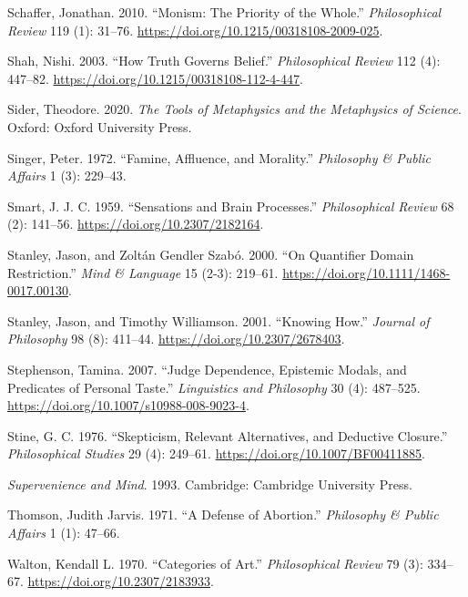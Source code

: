 \documentclass[
  12pt,
  letterpaper,
  DIV=11,
  numbers=noendperiod]{scrartcl}
\newlength{\cslhangindent}
\newenvironment{CSLReferences}[2] %
 {\begin{list}{}{%
  \setlength{\itemindent}{0pt}
  \setlength{\leftmargin}{0pt}
  \setlength{\parsep}{0pt}
  \ifodd #1
   \setlength{\leftmargin}{\cslhangindent}
   \setlength{\itemindent}{-1\cslhangindent}
  \fi
  \setlength{\itemsep}{#2\baselineskip}}}
 {\end{list}}
\begin{document}
\begin{CSLReferences}{1}{0}
Schaffer, Jonathan. 2010. {``Monism: The Priority of the Whole.''}
\emph{Philosophical Review} 119 (1): 31--76.
\url{https://doi.org/10.1215/00318108-2009-025}.

Shah, Nishi. 2003. {``How Truth Governs Belief.''} \emph{Philosophical
Review} 112 (4): 447--82.
\url{https://doi.org/10.1215/00318108-112-4-447}.

Sider, Theodore. 2020. \emph{The Tools of Metaphysics and the
Metaphysics of Science}. Oxford: Oxford University Press.

Singer, Peter. 1972. {``Famine, Affluence, and Morality.''}
\emph{Philosophy \& Public Affairs} 1 (3): 229--43.

Smart, J. J. C. 1959. {``Sensations and Brain Processes.''}
\emph{Philosophical Review} 68 (2): 141--56.
\url{https://doi.org/10.2307/2182164}.

Stanley, Jason, and Zoltán Gendler Szabó. 2000. {``On Quantifier Domain
Restriction.''} \emph{Mind \& Language} 15 (2-3): 219--61.
\url{https://doi.org/10.1111/1468-0017.00130}.

Stanley, Jason, and Timothy Williamson. 2001. {``Knowing How.''}
\emph{Journal of Philosophy} 98 (8): 411--44.
\url{https://doi.org/10.2307/2678403}.

Stephenson, Tamina. 2007. {``Judge Dependence, Epistemic Modals, and
Predicates of Personal Taste.''} \emph{Linguistics and Philosophy} 30
(4): 487--525. \url{https://doi.org/10.1007/s10988-008-9023-4}.

Stine, G. C. 1976. {``Skepticism, Relevant Alternatives, and Deductive
Closure.''} \emph{Philosophical Studies} 29 (4): 249--61.
\url{https://doi.org/10.1007/BF00411885}.

\emph{Supervenience and Mind}. 1993. Cambridge: {C}ambridge {U}niversity
{P}ress.

Thomson, Judith Jarvis. 1971. {``A Defense of Abortion.''}
\emph{Philosophy \& Public Affairs} 1 (1): 47--66.

Walton, Kendall L. 1970. {``Categories of Art.''} \emph{Philosophical
Review} 79 (3): 334--67. \url{https://doi.org/10.2307/2183933}.


\end{CSLReferences}
\end{document}
